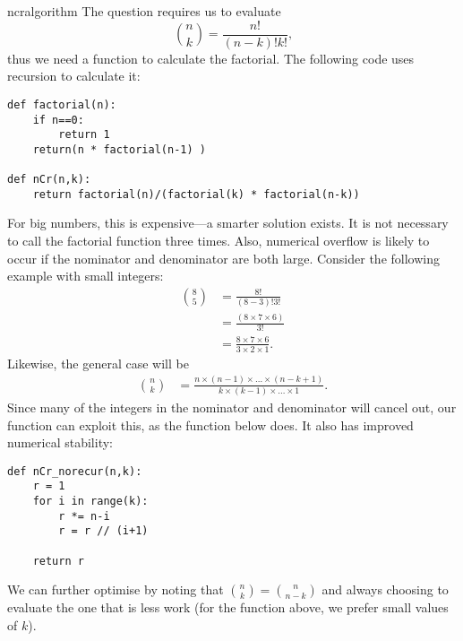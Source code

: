 \begin{answer}{ncralgorithm}
The question requires us to evaluate
\[
\binom{n}{k} = \frac{n!}{ (n-k)! k! }
\text{,}
\]
thus we need a function to calculate the factorial.
The following code uses recursion to calculate it:
\begin{verbatim}
def factorial(n):
    if n==0:
        return 1
    return(n * factorial(n-1) )

def nCr(n,k):
    return factorial(n)/(factorial(k) * factorial(n-k))
\end{verbatim}
For big numbers, this is expensive---a smarter solution exists.
It is not necessary to call the factorial function three times.
Also, numerical overflow is likely to occur if the nominator and denominator are both large.
Consider the following example with small integers:
\begin{align*}
\binom{8}{5} &= \frac{8!}{ (8-3)! 3! } \\
             &= \frac{(8 \times 7 \times 6 )}{3!} \\
             &= \frac{8 \times 7 \times 6 }{  3 \times 2 \times 1 }
\text{.}
\end{align*}
Likewise, the general case will be
\begin{align*}
\binom{n}{k}
             &= \frac
             { n \times (n-1) \times  \ldots \times (n-k+1) }
             { k \times (k-1) \times \ldots \times 1 }
\text{.}
\end{align*}
Since many of the integers in the nominator and denominator will cancel out, our function can exploit this, as the function below does. It also has improved numerical stability:
\begin{verbatim}
def nCr_norecur(n,k):
    r = 1
    for i in range(k):
        r *= n-i
        r = r // (i+1)

    return r
\end{verbatim}
We can further optimise by noting that $\binom{n}{k}=\binom{n}{n-k}$ and always choosing to evaluate the one that is less work (for the function above, we prefer small values of $k$).
\end{answer}
